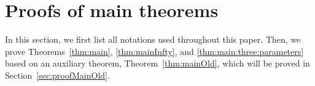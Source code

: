 \documentclass[nohyperref]{article}
\theoremstyle{plain}
\theoremstyle{definition}
\theoremstyle{remark}
\begin{document}





\newpage
\appendix
\onecolumn

\section{Proofs of main theorems}
\label{sec:proofMain}
In this section, we first list all notations used throughout this paper. Then, we prove Theorems~\ref{thm:main}, \ref{thm:mainInfty}, and \ref{thm:main:three:parameters} based on an auxiliary theorem, Theorem~\ref{thm:mainOld}, which will be proved in Section~\ref{sec:proofMainOld}.

\end{document}
